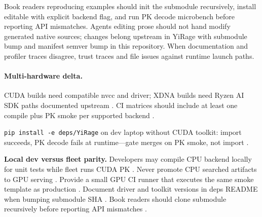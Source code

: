 Book readers reproducing examples should init the submodule recursively, install editable with explicit backend flag, and run PK decode microbench before reporting API mismatches. Agents editing prose should not hand modify generated native sources; changes belong upstream in YiRage with submodule bump and manifest semver bump in this repository. When documentation and profiler traces disagree, trust traces and file issues against runtime launch paths.

\paragraph{Multi-hardware delta.} CUDA builds need compatible nvcc and driver; XDNA builds need Ryzen AI SDK paths documented upstream \citep{amd2024xdna,amd2024aie,yirage2026,chen2020compilerbasedhardw,patel2025llminference,dlbook,semianalysis2024tma,taxbreak2026,memoryfloor2026,kwon2023vllm,liu2024deepseekv3,nvidia2024cudagraphs,dao2022flashattention,dao2023flashdecoding,nvidia2022hopper,dlbook}. CI matrices should include at least one compile plus PK smoke per supported backend \citep{yirage2026,chen2020compilerbasedhardw,patel2025llminference,amd2024aie,amd2024xdna,dlbook}.

\begin{example}
\texttt{pip install -e deps/YiRage} on dev laptop without CUDA toolkit: import succeeds, PK decode fails at runtime---gate merges on PK smoke, not import \citep{yirage2026,chen2020compilerbasedhardw,patel2025llminference,dlbook,taxbreak2026,memoryfloor2026,kwon2023vllm,nvidia2024cudagraphs,dao2022flashattention,dlbook}.
\end{example}

\textbf{Local dev versus fleet parity.} Developers may compile CPU backend locally for unit tests while fleet runs CUDA PK \citep{yirage2026,chen2020compilerbasedhardw,patel2025llminference,amd2024aie,amd2024xdna,dlbook}. Never promote CPU searched artifacts to GPU serving \citep{yirage2026,chen2020compilerbasedhardw,patel2025llminference,taxbreak2026,memoryfloor2026,dlbook}. Provide a small GPU CI runner that executes the same smoke template as production \citep{yirage2026,chen2020compilerbasedhardw,patel2025llminference,kwon2023vllm,dlbook}. Document driver and toolkit versions in deps README when bumping submodule SHA \citep{yirage2026,chen2020compilerbasedhardw,patel2025llminference,dlbook}. Book readers should clone submodule recursively before reporting API mismatches \citep{yirage2026,chen2020compilerbasedhardw,patel2025llminference,dlbook}.


